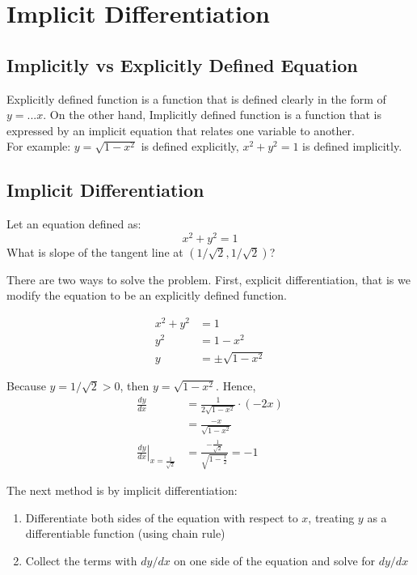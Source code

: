 \documentclass[12pt]{article}
\begin{document}
\section{Implicit Differentiation}
\subsection{Implicitly vs Explicitly Defined Equation}
Explicitly defined function is a function that is defined clearly in the form of $y = ...x$. On the other hand, Implicitly
defined function is a function that is expressed by an implicit equation that relates one variable to another. \\
For example: $y = \sqrt{1 - x^2}$ is defined explicitly, $x^2 + y^2 = 1$ is defined implicitly.
\subsection{Implicit Differentiation}
Let an equation defined as:
\[
    x^2 + y^2 = 1
\]
What is slope of the tangent line at $(1/\sqrt{2}, 1/\sqrt{2})$?

There are two ways to solve the problem. First, explicit differentiation, that is we modify the equation to be an 
explicitly defined function.

\begin{align*} 
    x^2 + y^2 &= 1 \\
    y^2 &= 1 - x^2 \\ 
    y &= \pm \sqrt{1 - x^2}
\end{align*}

Because $y = 1/\sqrt{2} > 0$, then $y = \sqrt{1 - x^2}$.
Hence,
\begin{align*} 
    \frac{dy}{dx} &= \frac{1}{2 \sqrt{1 - x^2}} \cdot ( - 2x)\\
    &= \frac{ - x}{\sqrt{1 - x^2}} \\
    \left. \frac{dy}{dx} \right|_{x = \frac{1}{\sqrt{2}}} &=  \frac{ - \frac{1}{\sqrt{2}}}{\sqrt{1 - \frac{1}{2}}} = - 1
\end{align*}

The next method is by implicit differentiation:
\begin{enumerate} 
    \item Differentiate both sides of the equation with respect to $x$, treating $y$ as a differentiable
    function (using chain rule)
    \item Collect the terms with $dy/dx$ on one side of the equation and solve for $dy/dx$
\end{enumerate}
\end{document}
